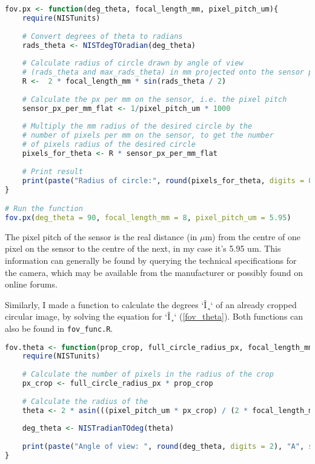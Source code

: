 \documentclass{article}
\begin{document}
\begin{lstlisting}[language=R, label=fov_func, caption=R function to calculate the pixel radius of a circle with a given zenith angle]
fov.px <- function(deg_theta, focal_length_mm, pixel_pitch_um){
	require(NISTunits)
	
	# Convert degrees of theta to radians
	rads_theta <- NISTdegTOradian(deg_theta) 
	
	# Calculate radius of circle drawn by angle of view 
	# (rads_theta and max_rads_theta) in mm projected onto the sensor plane
	R <-  2 * focal_length_mm * sin(rads_theta / 2)
	
	# Calculate the px per mm on the sensor, i.e. the pixel pitch
	sensor_px_per_mm_flat <- 1/pixel_pitch_um * 1000
	
	# Multiply the mm radius of the desired circle by the 
	# number of pixels per mm on the sensor, to get the number 
	# of pixels radius of the desired circle
	pixels_for_theta <- R * sensor_px_per_mm_flat
	
	# Print result
	print(paste("Radius of circle:", round(pixels_for_theta, digits = 0), "px"))
}

# Run the function
fov.px(deg_theta = 90, focal_length_mm = 8, pixel_pitch_um = 5.95)
\end{lstlisting}

The pixel pitch of the sensor is the real distance (in $\mu$m) from the centre of one pixel on the sensor to the centre of the next, in my case it's 5.95 um. This information can generally be found by querying the technical specifications for the camera, which may be available from the manufacturer or possibly found on online forums.

Similarly, I made a function to calculate the degrees `Î¸` of an already cropped circular image, by solving the equation for `Î¸` (\autoref{fov_theta}). Both functions can also be found in \texttt{fov\_func.R}.

\begin{lstlisting}[language=R, label=fov_theta, caption=R function to calculate the zenith angle from a cropped circular image.]
fov.theta <- function(prop_crop, full_circle_radius_px, focal_length_mm, pixel_pitch_um){
	require(NISTunits)
	
	# Calculate the number of pixels in the radius of the crop
	px_crop <- full_circle_radius_px * prop_crop
	
	# Calculate the radius of the 
	theta <- 2 * asin(((pixel_pitch_um * px_crop) / (2 * focal_length_mm * 1000)))
	
	deg_theta <- NISTradianTOdeg(theta)
	
	print(paste("Angle of view: ", round(deg_theta, digits = 2), "A", sep = ""))
}
\end{lstlisting}
\end{document}
